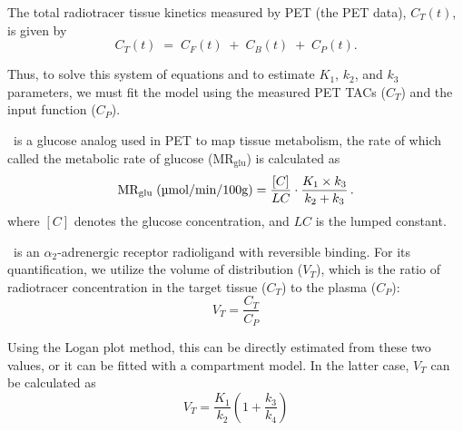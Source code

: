 The total radiotracer tissue kinetics measured by PET (the PET data), \(C_T(t)\), is given by
\begin{equation}
	C_T(t) \;=\; C_F(t) \;+\; C_B(t) \;+\; C_P(t).
\end{equation}

Thus, to solve this system of equations and to estimate \(K_1\), \(k_2\), and \(k_3\) parameters, we must fit the model using the measured PET TACs ($C_T$) and the input function ($C_P$).

\fdg\ is a glucose analog used in PET to map tissue metabolism, the rate of which called the metabolic rate of glucose (\(\textrm{MR}_{\textrm{glu}}\)) is calculated as
\begin{equation}
	\textrm{MR}_{\textrm{glu}} \; (\textrm{\textmu mol/min/100g}) = \frac{[C]}{LC} \cdot \frac{K_1 \times k_3}{k_2 + k_3} \,.
\end{equation}
where \([C]\) denotes the glucose concentration, and \(LC\) is the lumped constant.

\yohimbine\ is an $\alpha_2$-adrenergic receptor radioligand with reversible binding.
For its quantification, we utilize the volume of distribution ($V_T$), which is the ratio of radiotracer concentration in the target tissue ($C_T$) to the plasma ($C_P$):
\begin{equation}
	V_T = \frac{C_T}{C_P}
\end{equation}

Using the Logan plot method, this can be directly estimated from these two values, or it can be fitted with a compartment model.
In the latter case, $V_T$ can be calculated as
\begin{equation}
	V_T = \frac{K_1}{k_2} (1+\frac{k_3}{k_4})
\end{equation}

